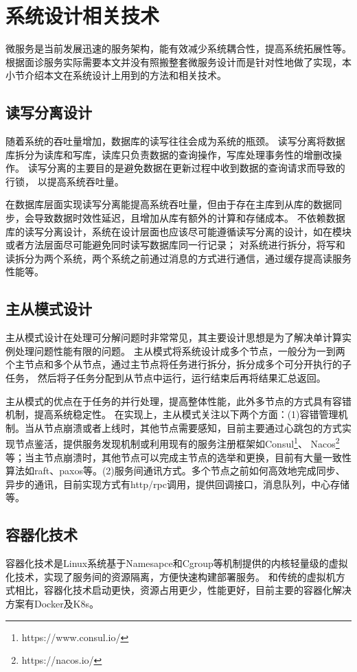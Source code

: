 \section{系统设计相关技术}
微服务是当前发展迅速的服务架构\cite{jamshidi2018microservices}，能有效减少系统耦合性，提高系统拓展性等。
根据面诊服务实际需要本文并没有照搬整套微服务设计而是针对性地做了实现，本小节介绍本文在系统设计上用到的方法和相关技术。

\subsection{读写分离设计}
随着系统的吞吐量增加，数据库的读写往往会成为系统的瓶颈。
读写分离将数据库拆分为读库和写库，读库只负责数据的查询操作，写库处理事务性的增删改操作。
读写分离的主要目的是避免数据在更新过程中收到数据的查询请求而导致的行锁，
以提高系统吞吐量。

在数据库层面实现读写分离能提高系统吞吐量，但由于存在主库到从库的数据同步，会导致数据时效性延迟，且增加从库有额外的计算和存储成本。
不依赖数据库的读写分离设计，系统在设计层面也应该尽可能遵循读写分离的设计，如在模块或者方法层面尽可能避免同时读写数据库同一行记录；
对系统进行拆分，将写和读拆分为两个系统，两个系统之前通过消息的方式进行通信，通过缓存提高读服务性能等。

\subsection{主从模式设计}
主从模式设计在处理可分解问题时非常常见，其主要设计思想是为了解决单计算实例处理问题性能有限的问题。
主从模式将系统设计成多个节点，一般分为一到两个主节点和多个从节点，通过主节点将任务进行拆分，拆分成多个可分开执行的子任务，
然后将子任务分配到从节点中运行，运行结束后再将结果汇总返回。

主从模式的优点在于任务的并行处理，提高整体性能，此外多节点的方式具有容错机制，提高系统稳定性。
在实现上，主从模式关注以下两个方面：(1)容错管理机制。当从节点崩溃或者上线时，其他节点需要感知，目前主要通过心跳包的方式实现节点鉴活，提供服务发现机制或利用现有的服务注册框架如Consul\footnote{https://www.consul.io/}、 Nacos\footnote{https://nacos.io/}等；当主节点崩溃时，其他节点可以完成主节点的选举和更换，目前有大量一致性算法如raft、paxos等。(2)服务间通讯方式。多个节点之前如何高效地完成同步、异步的通讯，目前实现方式有http/rpc调用，提供回调接口，消息队列，中心存储等。

\subsection{容器化技术}
容器化技术是Linux系统基于Namesapce和Cgroup等机制提供的内核轻量级的虚拟化技术，实现了服务间的资源隔离，方便快速构建部署服务。
和传统的虚拟机方式相比，容器化技术启动更快，资源占用更少，性能更好，目前主要的容器化解决方案有Docker及K8s。

